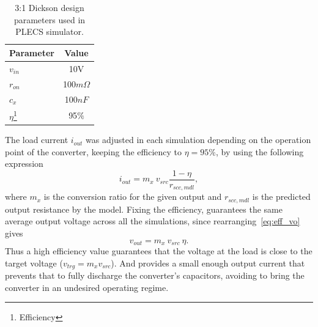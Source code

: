 \begin{table}[h]
\centering
\caption{3:1 Dickson design parameters used in PLECS simulator.}
\section{\label{tab:sim_values}}
\renewcommand{\arraystretch}{1.5}%
\begin{tabular}{l | c  }
 Parameter  &  Value  \\
 \midrule
 $v_{in}$   & 10V \\
 $r_{on}$   & 100$m\Omega$ \\
 $c_x$      & 100$nF$\\
 $\eta$\footnote{Efficiency} & 95$\%$
\end{tabular}
\end{table}

The load current $i_{out}$ was adjusted in each simulation depending on the operation point of the converter, keeping the efficiency to $\eta=95\%$, by using the following expression
\begin{equation}
    i_{out}=m_x~v_{src}\frac{1-\eta}{r_{scc,mdl}},
\label{eq:iout_eff}
\end{equation}
where $m_x$ is the conversion ratio for the given output and $r_{scc,mdl}$ is the predicted output resistance by the model. Fixing the efficiency, guarantees the same average output voltage across all the simulations, since rearranging~\eqref{eq:eff_vo} gives
\begin{equation}
    v_{out}=m_x~v_{src}~\eta.
\label{eq:vout_eff}
\end{equation}
Thus a high efficiency value guarantees that the voltage at the load is close to the target voltage ($v_{trg}=m_x v_{src}$). And provides a small enough output current that prevents that to fully discharge the converter's capacitors, avoiding to bring the converter in an undesired operating regime.

